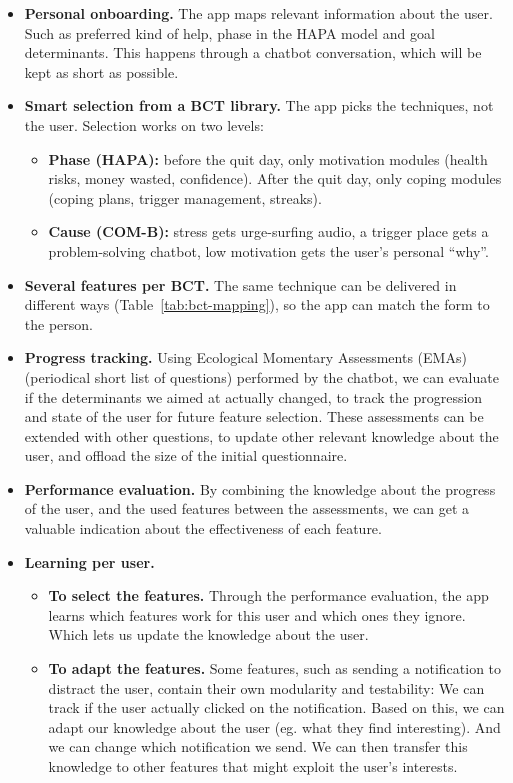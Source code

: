 \begin{itemize}
    \item \textbf{Personal onboarding.} The app maps relevant information about the user. Such as preferred kind of help, phase in the HAPA model and goal determinants. This happens through a chatbot conversation, which will be kept as short as possible.
    \item \textbf{Smart selection from a BCT library.} The app picks the techniques, not the user. Selection works on two levels:
    \begin{itemize}
        \item \textbf{Phase (HAPA):} before the quit day, only motivation modules (health risks, money wasted, confidence). After the quit day, only coping modules (coping plans, trigger management, streaks).
        \item \textbf{Cause (COM-B):} stress gets urge-surfing audio, a trigger place gets a problem-solving chatbot, low motivation gets the user's personal ``why''.
    \end{itemize}
    \item \textbf{Several features per BCT.} The same technique can be delivered in different ways (Table~\ref{tab:bct-mapping}), so the app can match the form to the person.
    \item \textbf{Progress tracking.} Using Ecological Momentary Assessments (EMAs) (periodical short list of questions) performed by the chatbot, we can evaluate if the determinants we aimed at actually changed, to track the progression and state of the user for future feature selection. These assessments can be extended with other questions, to update other relevant knowledge about the user, and offload the size of the initial questionnaire.
    \item \textbf{Performance evaluation.} By combining the knowledge about the progress of the user, and the used features between the assessments, we can get a valuable indication about the effectiveness of each feature.
    \item \textbf{Learning per user.}
    \begin{itemize}
        \item \textbf{To select the features.} Through the performance evaluation, the app learns which features work for this user and which ones they ignore. Which lets us update the knowledge about the user.
        \item \textbf{To adapt the features.} Some features, such as sending a notification to distract the user, contain their own modularity and testability: We can track if the user actually clicked on the notification. Based on this, we can adapt our knowledge about the user (eg. what they find interesting). And we can change which notification we send. We can then transfer this knowledge to other features that might exploit the user's interests.

\end{itemize}
\end{itemize}
